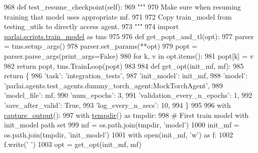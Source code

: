 \begin{DoxyCode}
968     \textcolor{keyword}{def }test\_resume\_checkpoint(self):
969         \textcolor{stringliteral}{"""}
970 \textcolor{stringliteral}{        Make sure when resuming training that model uses appropriate mf.}
971 \textcolor{stringliteral}{}
972 \textcolor{stringliteral}{        Copy train\_model from testing\_utils to directly access agent.}
973 \textcolor{stringliteral}{        """}
974         \textcolor{keyword}{import} \hyperlink{namespaceparlai_1_1scripts_1_1train__model}{parlai.scripts.train\_model} \textcolor{keyword}{as} tms
975 
976         \textcolor{keyword}{def }get\_popt\_and\_tl(opt):
977             parser = tms.setup\_args()
978             parser.set\_params(**opt)
979             popt = parser.parse\_args(print\_args=\textcolor{keyword}{False})
980             \textcolor{keywordflow}{for} k, v \textcolor{keywordflow}{in} opt.items():
981                 popt[k] = v
982             \textcolor{keywordflow}{return} popt, tms.TrainLoop(popt)
983 
984         \textcolor{keyword}{def }get\_opt(init\_mf, mf):
985             \textcolor{keywordflow}{return} \{
986                 \textcolor{stringliteral}{'task'}: \textcolor{stringliteral}{'integration\_tests'},
987                 \textcolor{stringliteral}{'init\_model'}: init\_mf,
988                 \textcolor{stringliteral}{'model'}: \textcolor{stringliteral}{'parlai.agents.test\_agents.dummy\_torch\_agent:MockTorchAgent'},
989                 \textcolor{stringliteral}{'model\_file'}: mf,
990                 \textcolor{stringliteral}{'num\_epochs'}: 3,
991                 \textcolor{stringliteral}{'validation\_every\_n\_epochs'}: 1,
992                 \textcolor{stringliteral}{'save\_after\_valid'}: \textcolor{keyword}{True},
993                 \textcolor{stringliteral}{'log\_every\_n\_secs'}: 10,
994             \}
995 
996         with \hyperlink{namespaceparlai_1_1utils_1_1testing_ab00d4d693202afab92c06387aa50699b}{capture\_output}():
997             with \hyperlink{namespaceparlai_1_1utils_1_1testing_a0945b769a10c0c844b29c02ff26445a5}{tempdir}() \textcolor{keyword}{as} tmpdir:
998                 \textcolor{comment}{# First train model with init\_model path set}
999                 mf = os.path.join(tmpdir, \textcolor{stringliteral}{'model'})
1000                 init\_mf = os.path.join(tmpdir, \textcolor{stringliteral}{'init\_model'})
1001                 with open(init\_mf, \textcolor{stringliteral}{'w'}) \textcolor{keyword}{as} f:
1002                     f.write(\textcolor{stringliteral}{' '})
1003                 opt = get\_opt(init\_mf, mf)

\end{DoxyCode}

